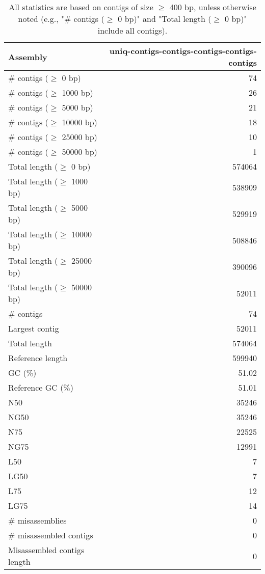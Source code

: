 \documentclass[12pt,a4paper]{article}
\begin{document}
\begin{table}[ht]
\begin{center}
\caption{All statistics are based on contigs of size $\geq$ 400 bp, unless otherwise noted (e.g., "\# contigs ($\geq$ 0 bp)" and "Total length ($\geq$ 0 bp)" include all contigs).}
\begin{tabular}{|l*{1}{|r}|}
\hline
Assembly & uniq-contigs-contigs-contigs-contigs-contigs \\ \hline
\# contigs ($\geq$ 0 bp) & 74 \\ \hline
\# contigs ($\geq$ 1000 bp) & 26 \\ \hline
\# contigs ($\geq$ 5000 bp) & 21 \\ \hline
\# contigs ($\geq$ 10000 bp) & 18 \\ \hline
\# contigs ($\geq$ 25000 bp) & 10 \\ \hline
\# contigs ($\geq$ 50000 bp) & 1 \\ \hline
Total length ($\geq$ 0 bp) & 574064 \\ \hline
Total length ($\geq$ 1000 bp) & 538909 \\ \hline
Total length ($\geq$ 5000 bp) & 529919 \\ \hline
Total length ($\geq$ 10000 bp) & 508846 \\ \hline
Total length ($\geq$ 25000 bp) & 390096 \\ \hline
Total length ($\geq$ 50000 bp) & 52011 \\ \hline
\# contigs & 74 \\ \hline
Largest contig & 52011 \\ \hline
Total length & 574064 \\ \hline
Reference length & 599940 \\ \hline
GC (\%) & 51.02 \\ \hline
Reference GC (\%) & 51.01 \\ \hline
N50 & 35246 \\ \hline
NG50 & 35246 \\ \hline
N75 & 22525 \\ \hline
NG75 & 12991 \\ \hline
L50 & 7 \\ \hline
LG50 & 7 \\ \hline
L75 & 12 \\ \hline
LG75 & 14 \\ \hline
\# misassemblies & 0 \\ \hline
\# misassembled contigs & 0 \\ \hline
Misassembled contigs length & 0 \\ \hline

\end{tabular}
\end{center}
\end{table}
\end{document}
